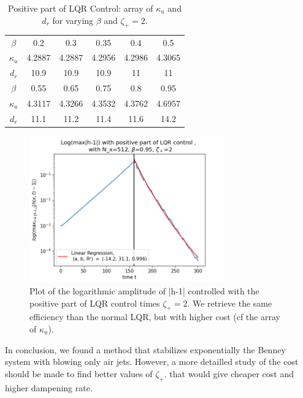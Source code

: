 \documentclass[12pt]{article}
\begin{document}
\begin{table}[ht]
    \caption{Positive part of LQR Control: array of $\kappa_u$ and $d_r$ for varying $\beta$ and $\zeta_+ = 2$.}
    \label{tab:LQR_cost_beta_pospart}
    \centering
        \begin{tabular}{ |c|c|c|c|c|c| }
        \hline
        $\beta$ & 0.2 & 0.3 & 0.35 & 0.4 & 0.5 \\
        $\kappa_u$ & 4.2887 & 4.2887 & 4.2956 & 4.2986 &4.3065 \\ 
        $d_r$ & 10.9 & 10.9 & 10.9 & 11 & 11\\
        \hline
        $\beta$ & 0.55 & 0.65 & 0.75 & 0.8 & 0.95 \\
        $\kappa_u$ & 4.3117 & 4.3266 & 4.3532 & 4.3762 & 4.6957 \\ 
        $d_r$ & 11.1 & 11.2 & 11.4 & 11.6 & 14.2\\
        \hline
        \end{tabular}
\end{table}

\begin{figure}[h]
\centering
\includegraphics[width=0.75\textwidth]{Control_experiments/Pos_part2_LQR_beta_0.95.png}
\caption{Plot of the logarithmic amplitude of |h-1| controlled with the positive part 
of LQR control times $\zeta_+ = 2$. We retrieve the same efficiency than the normal LQR, but with 
higher cost (cf the array of $\kappa_u$). }
\label{fig:Pos_part2_LQR_beta_0.95}
\end{figure}

In conclusion, we found a method that stabilizes exponentially the Benney system with blowing only air jets.
However, a more detailled study of the cost should be made to find better values of $\zeta_+$.
that would give cheaper cost and higher dampening rate. 
\end{document}
